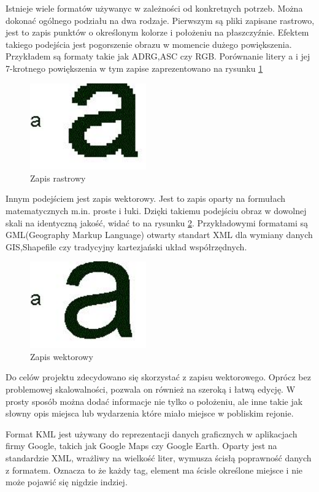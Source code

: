 Istnieje wiele formatów używanyc w zależności od konkretnych potrzeb. Można dokonać ogólnego podziału na dwa rodzaje. Pierwszym są pliki zapisane rastrowo, jest to zapis punktów o określonym kolorze i położeniu na płaszczyźnie. Efektem takiego podejścia jest pogorszenie obrazu w momencie dużego powiększenia. Przykładem są formaty takie jak ADRG,ASC czy RGB.
Porównanie litery a i jej 7-krotnego powiększenia w tym zapise zaprezentowano na rysunku \ref{fig:rast}
  \begin{figure}[H]
  \centering
    \includegraphics[width=50mm]{ge/a2.jpg}
  \caption{Zapis rastrowy}
  \label{fig:rast}
  \end{figure}

Innym podejściem jest zapis wektorowy. Jest to zapis oparty na formułach matematycznych m.in. proste i łuki. Dzięki takiemu podejściu obraz w dowolnej skali na identyczną jakość, widać to na rysunku \ref{fig:wekt}. Przykładowymi formatami są GML(Geography Markup Language) otwarty standart XML dla wymiany danych GIS,Shapefile czy tradycyjny kartezjański układ współrzędnych.

  \begin{figure}[H]
  \centering
    \includegraphics[width=50mm]{ge/a1.jpg}
  \caption{Zapis wektorowy}
  \label{fig:wekt}
  \end{figure}

Do celów projektu zdecydowano się skorzystać z zapisu wektorowego. Oprócz bez problemowej skalowalności, pozwala on również na szeroką i łatwą edycję. W prosty sposób można dodać informacje nie tylko o położeniu, ale inne takie jak słowny opis miejsca lub wydarzenia które miało miejsce w pobliskim rejonie.

Format KML jest używany do reprezentacji danych graficznych w aplikacjach firmy Google, takich jak Google Maps czy Google Earth. Oparty jest na standardzie XML, wrażliwy na wielkość liter, wymusza ścisłą poprawność danych z formatem. Oznacza to że każdy tag, element ma ścisle określone miejsce i nie może pojawić się nigdzie indziej.

